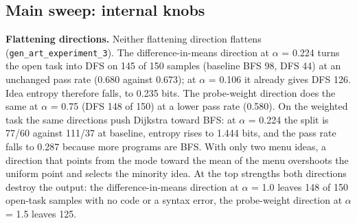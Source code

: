 \documentclass[11pt,letterpaper]{article}
\begin{document}
\subsection{Main sweep: internal knobs}
\textbf{Flattening directions.} Neither flattening direction flattens (\texttt{gen\_\allowbreak{}art\_\allowbreak{}experiment\_\allowbreak{}3}). The difference-in-means direction at \ensuremath{\alpha} = 0.224 turns the open task into DFS on 145 of 150 samples (baseline BFS 98, DFS 44) at an unchanged pass rate (0.680 against 0.673); at \ensuremath{\alpha} = 0.106 it already gives DFS 126. Idea entropy therefore falls, to 0.235 bits. The probe-weight direction does the same at \ensuremath{\alpha} = 0.75 (DFS 148 of 150) at a lower pass rate (0.580). On the weighted task the same directions push Dijkstra toward BFS: at \ensuremath{\alpha} = 0.224 the split is 77/60 against 111/37 at baseline, entropy rises to 1.444 bits, and the pass rate falls to 0.287 because more programs are BFS. With only two menu ideas, a direction that points from the mode toward the mean of the menu overshoots the uniform point and selects the minority idea. At the top strengths both directions destroy the output: the difference-in-means direction at \ensuremath{\alpha} = 1.0 leaves 148 of 150 open-task samples with no code or a syntax error, the probe-weight direction at \ensuremath{\alpha} = 1.5 leaves 125.
\end{document}
